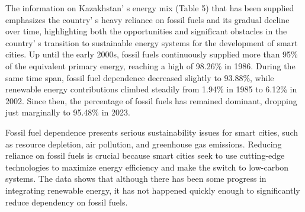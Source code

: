 {%

The information on Kazakhstan' s energy mix (Table 5)
that has been supplied emphasizes the country' s heavy
reliance on fossil fuels and its gradual decline over time, highlighting
both the opportunities and significant obstacles in the
country' s transition to sustainable energy systems for
the development of smart cities. Up until the early 2000s, fossil fuels
continuously supplied more than 95\% of the equivalent primary energy,
reaching a high of 98.26\% in 1986. During the same time span, fossil
fuel dependence decreased slightly to 93.88\%, while renewable energy
contributions climbed steadily from 1.94\% in 1985 to 6.12\% in 2002.
Since then, the percentage of fossil fuels has remained dominant,
dropping just marginally to 95.48\% in 2023.

Fossil fuel dependence presents serious sustainability issues for smart
cities, such as resource depletion, air pollution, and greenhouse gas
emissions. Reducing reliance on fossil fuels is crucial because smart
cities seek to use cutting-edge technologies to maximize energy
efficiency and make the switch to low-carbon systems. The data shows
that although there has been some progress in integrating renewable
energy, it has not happened quickly enough to significantly reduce
dependency on fossil fuels.

}
